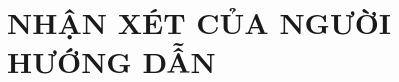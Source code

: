 \documentclass[11pt]{report}
\begin{document}
	\chapter*{NHẬN XÉT CỦA NGƯỜI HƯỚNG DẪN}
	\dotfill\\\dotfill\\\dotfill\\\dotfill\\\dotfill
	\\\dotfill\\\dotfill\\\dotfill\\\dotfill\\\dotfill
	\\\dotfill\\\dotfill\\\dotfill\\\dotfill\\\dotfill
	\\\dotfill\\\dotfill\\\dotfill\\\dotfill\\\dotfill
	\\\dotfill\\\dotfill\\\dotfill\\\dotfill\\\dotfill
	\\\dotfill\\\dotfill\\\dotfill\\\dotfill\\\dotfill
	\\\dotfill\\\dotfill\\\dotfill\\\dotfill\\
	\pagebreak
	
\end{document}
